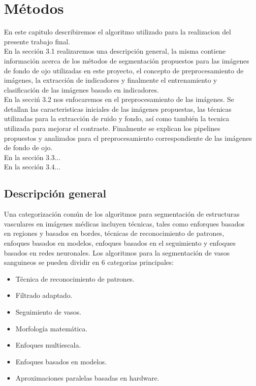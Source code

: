 
\chapter{M\'etodos} %

En este capitulo describiremos el algoritmo utilizado para la realizacion del presente trabajo final.\\

En la secci\'on 3.1 realizaremos una descripci\'on general, la misma contiene informaci\'on acerca de  los m\'etodos de segmentaci\'on propuestos para las im\'agenes de fondo de ojo utilizadas en este proyecto, el concepto de preprocesamiento de im\'agenes, la extracci\'on de indicadores y finalmente el entrenamiento y clasificaci\'on de las im\'agenes basado en indicadores.\\

En la secci\'n 3.2 nos enfocaremos en el preprocesamiento de las im\'agenes. Se detallan las caracteristicas iniciales de las im\'agenes propuestas, las t\'ecnicas utilizadas para la extracci\'on de ruido y fondo, as\'i como tambi\'en la tecnica utilizada para mejorar el contraste. Finalmente se explican los pipelines propuestos y analizados para el preprocesamiento correspondiente de las im\'agenes de fondo de ojo.\\

En la secci\'on 3.3...\\

En la secci\'on 3.4...\\
\label{Chapter3} %


\section{Descripci\'on general}

Una categorizaci\'on com\'un de los algoritmos para segmentaci\'on de estructuras vasculares en im\'agenes m\'edicas incluyen t\'ecnicas, tales como enforques basados en regiones y basados en bordes, t\'ecnicas de reconocimiento de patrones, enfoques basados en modelos, enfoques basados en el seguimiento y enfoques basados en redes neuronales. Los algoritmos para la segmentaci\'on de vasos sanguineos se pueden dividir en 6 categorias principales:
\begin{itemize}
	\item T\'ecnica de reconocimiento de patrones.
	\item Filtrado adaptado.
	\item Seguimiento de vasos.
	\item Morfolog\'ia matem\'atica.
	\item Enfoques multiescala.
	\item Enfoques basados en modelos.
	\item Aproximaciones paralelas basadas en hardware.
\end{itemize}
	
